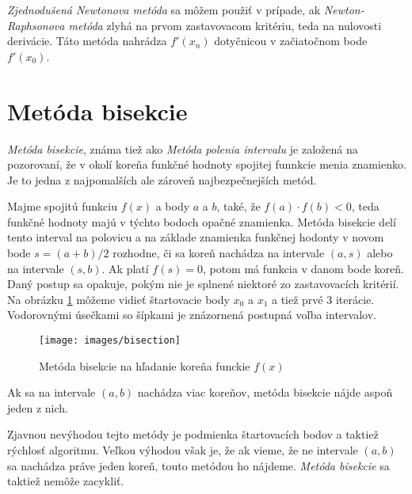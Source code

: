 \textit{Zjednodušená Newtonova metóda} sa môžem použiť v prípade, ak \textit{Newton-Raphsonova metóda} zlyhá na prvom 
zastavovacom kritériu, teda na nulovosti derivácie. Táto metóda nahrádza $f'(x_n)$ dotyčnicou v začiatočnom bode $f'(x_0)$.  
\fi

\section{Metóda bisekcie}

\textit{Metóda bisekcie}, známa tiež ako \textit{Metóda polenia intervalu} je založená 
na pozorovaní, že v okolí koreňa funkčné hodnoty spojitej funnkcie menia znamienko. 
Je to jedna z najpomalších ale zároveň najbezpečnejších metód.

Majme spojitú funkciu $f(x)$ a body $a$ a $b$, také, že $f(a) \cdot f(b) < 0$, teda 
funkčné hodnoty majú v týchto bodoch opačné znamienka. Metóda bisekcie delí tento 
interval na polovicu a na základe znamienka funkčnej hodonty v novom bode $s = (a+b)/2$
rozhodne, či sa koreň nachádza na intervale $(a, s)$ alebo na intervale $(s, b)$. 
Ak platí $f(s) = 0$, potom má funkcia v danom bode koreň. Daný postup sa opakuje, 
pokým nie je splnené niektoré zo zastavovacích kritérií. Na obrázku \ref{obr:bisection}
môžeme vidieť štartovacie body $x_0$ a $x_1$ a tiež prvé 3 iterácie. Vodorovnými
úsečkami so šípkami je znázornená postupná voľba intervalov. 

\begin{figure}
    \centerline{\texttt{[image: images/bisection]}}
    \caption[Metóda bisekcie na hľadanie koreňa funckie $f(x)$]{Metóda bisekcie na hľadanie koreňa funckie $f(x)$}
    \label{obr:bisection}
\end{figure}

Ak sa na intervale $(a, b)$ nachádza viac koreňov, metóda bisekcie nájde aspoň jeden z nich.

Zjavnou nevýhodou tejto metódy je podmienka štartovacích bodov a taktiež rýchlosť algoritmu. 
Veľkou výhodou však je, že ak vieme, že ne intervale $(a, b)$ sa nachádza práve jeden koreň, 
touto metódou ho nájdeme. \textit{Metóda bisekcie} sa taktiež nemôže zacykliť.

